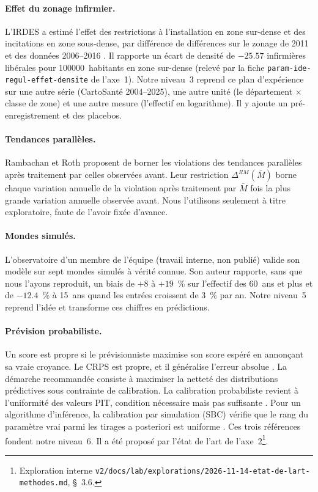 \paragraph{Effet du zonage infirmier.} L'IRDES a estimé l'effet des restrictions à l'installation en
zone sur-dense et des incitations en zone sous-dense, par différence de différences sur le zonage de
2011 et des données 2006--2016 \citep{a3-irdes270}. Il rapporte un écart de densité de $-\num{25.57}$\mesure{}
infirmières libérales pour \num{100000}~habitants en zone sur-dense (relevé par la fiche
\texttt{param-ide-regul-effet-densite} de l'axe~1). Notre niveau~3 reprend ce plan d'expérience sur
une autre série (CartoSanté 2004--2025), une autre unité (le département $\times$ classe de zone) et
une autre mesure (l'effectif en logarithme). Il y ajoute un pré-enregistrement et des placebos.

\paragraph{Tendances parallèles.} Rambachan et Roth \citep{a3-rambachan2023} proposent de borner les
violations des tendances parallèles après traitement par celles observées avant. Leur restriction
$\Delta^{RM}(\bar M)$ borne chaque variation annuelle de la violation après traitement par
$\bar M$ fois la plus grande variation annuelle observée avant. Nous l'utilisons seulement à titre
exploratoire, faute de l'avoir fixée d'avance.

\paragraph{Mondes simulés.} L'observatoire d'un membre de l'équipe (travail interne, non publié)
valide son modèle sur sept mondes simulés à vérité connue. Son auteur rapporte, sans que nous
l'ayons reproduit,
un biais de $+8$ à $+19$~\% sur l'effectif des 60~ans et plus et de $-\num{12.4}$~\% à 15~ans quand
les entrées croissent de 3~\% par an. Notre niveau~5 reprend l'idée et transforme ces chiffres en
prédictions.

\paragraph{Prévision probabiliste.} Un score est propre si le prévisionniste maximise son score
espéré en annonçant sa vraie croyance. Le CRPS est propre, et il généralise l'erreur absolue
\citep{a3-gneiting2007jasa}. La démarche recommandée consiste à maximiser la netteté des distributions
prédictives sous contrainte de calibration. La calibration probabiliste revient à l'uniformité des
valeurs PIT, condition nécessaire mais pas suffisante \citep{a3-gneiting2007jrssb}. Pour un
algorithme d'inférence, la calibration par simulation (SBC) vérifie que le rang du paramètre vrai
parmi les tirages a posteriori est uniforme \citep{a3-talts2018sbc}. Ces trois références fondent
notre niveau~6. Il a été proposé par l'état de l'art de l'axe~2\footnote{Exploration interne
\texttt{v2/docs/lab/explorations/2026-11-14-etat-de-lart-methodes.md}, \S~3.6.}.

